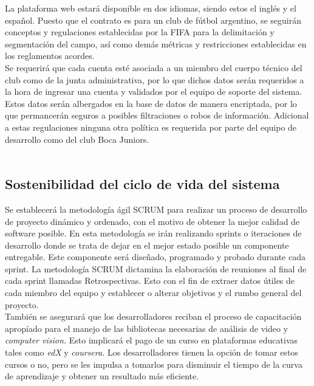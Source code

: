 \documentclass[a4paper]{article}
\newcommand\tab[1][0.55cm]{\hspace*{#1}}
\begin{document}
{	\tab La plataforma web estará disponible en dos idiomas, siendo estos el inglés y el español. Puesto que el contrato es para un club de fútbol argentino, se seguirán conceptos y regulaciones establecidas por la FIFA para la delimitación y segmentación del campo, así como demás métricas y restricciones establecidas en los reglamentos acordes.  \\
    
    Se requerirá que cada cuenta esté asociada a un miembro del cuerpo técnico del club como de la junta administrativa, por lo que dichos datos serán requeridos a la hora de ingresar una cuenta y validados por el equipo de soporte del sistema. Estos datos serán albergados en la base de datos de manera encriptada, por lo que permancerán seguros a posibles filtraciones o robos de información. Adicional a estas regulaciones ninguna otra política es requerida por parte del equipo de desarrollo como del club Boca Juniors. \\ \\

\color{Blue}
\subsection{Sostenibilidad del ciclo de vida del sistema}
\color{black}
\justify 

	\tab Se establecerá la metodología ágil SCRUM para realizar un proceso de desarrollo de proyecto dinámico y ordenado, con el motivo de obtener la mejor calidad de software posible. En esta metodología se irán realizando sprints o iteraciones de desarrollo donde se trata de dejar en el mejor estado posible un componente entregable. Este componente será diseñado, programado y probado durante cada sprint. La metodología SCRUM dictamina la elaboración de reuniones al final de cada sprint llamadas Retrospectivas. Esto con el fin de extraer datos útiles de cada miembro del equipo y establecer o alterar objetivos y el rumbo general del proyecto.  \\
    
    También se asegurará que los desarrolladores reciban el proceso de capacitación apropíado para el manejo de las bibliotecas necesarias de análisis de video y \textit{computer vision.} Esto implicará el pago de un curso en plataformas educativas tales como \textit{edX} y \textit{coursera.} Los desarrolladores tienen la opción de tomar estos cursos o no, pero se les impulsa a tomarlos para disminuir el tiempo de la curva de aprendizaje y obtener un resultado más eficiente. \\
    
}
\end{document}
